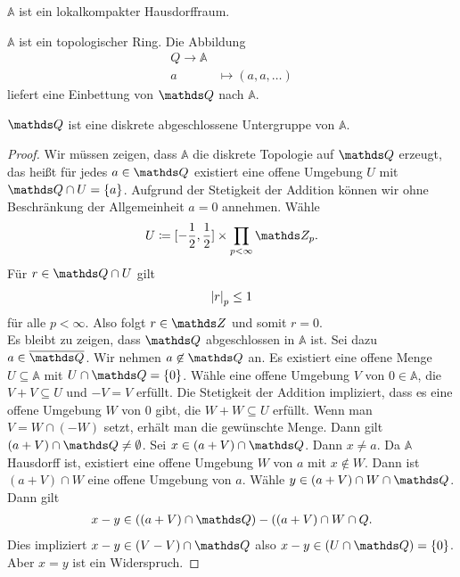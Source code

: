 \begin{bem}
$\mathbb{A}$ ist ein lokalkompakter Hausdorffraum.
\end{bem}

\begin{prop}
$\mathbb{A}$ ist ein topologischer Ring.
Die Abbildung
\begin{align*}
Q \to \mathbb{A}\\
a &\mapsto (a,a,\dots)
\end{align*}
liefert eine Einbettung von $\Q$ nach $\mathbb{A}$.
\end{prop}

\begin{prop}
$\Q$ ist eine diskrete abgeschlossene Untergruppe von $\mathbb{A}$.
\end{prop}
\begin{proof}
Wir müssen zeigen, dass $\mathbb{A}$ die diskrete Topologie auf $\Q$ erzeugt, das heißt für jedes $a\in \Q$ existiert eine offene Umgebung $U$ mit $\Q \cap U=\{a\}$.
Aufgrund der Stetigkeit der Addition können wir ohne Beschränkung der Allgemeinheit $a=0$ annehmen.
Wähle
\begin{align*}
U\coloneqq [-\frac{1}{2},\frac{1}{2}] \times \prod_{p <\infty} \Z_p.
\end{align*}
Für $r \in \Q \cap U$ gilt
\begin{align*}
\left\vert r\right\vert_p \leq 1
\end{align*}
für alle $p<\infty$.
Also folgt $r\in \Z$ und somit $r=0$.\\
Es bleibt zu zeigen, dass $\Q$ abgeschlossen in $\mathbb{A}$ ist.
Sei dazu $a\in \overline{\Q}$. Wir nehmen $a \not \in \Q$ an.
Es existiert eine offene Menge $U \subseteq \mathbb{A}$ mit $U \cap \Q=\{0\}$.
Wähle eine offene Umgebung $V$ von $0\in \mathbb{A}$, die $V+V \subseteq U$ und $-V=V$ erfüllt.
Die Stetigkeit der Addition impliziert, dass es eine offene Umgebung $W$ von $0$ gibt, die $W+W\subseteq U$ erfüllt. Wenn man $V=W \cap (-W)$ setzt, erhält man die gewünschte Menge.
Dann gilt $(a+V)\cap \Q\not=\emptyset$.
Sei $x\in (a+V)\cap \Q$. Dann $x\not =a$.
Da $\mathbb{A}$ Hausdorff ist, existiert eine offene Umgebung $W$ von $a$ mit $x\not \in W$.
Dann ist $(a+V)\cap W$ eine offene Umgebung von $a$.
Wähle $y \in (a+V)\cap W \cap \Q$.
Dann gilt
\begin{align*}
x-y\in ((a+V)\cap \Q)-((a+V)\cap W \cap Q.
\end{align*}
Dies impliziert $x-y \in  (V-V)\cap \Q$ also $x-y\in (U\cap \Q)=\{0\}$.
Aber $x=y$ ist ein Widerspruch.
\end{proof}


